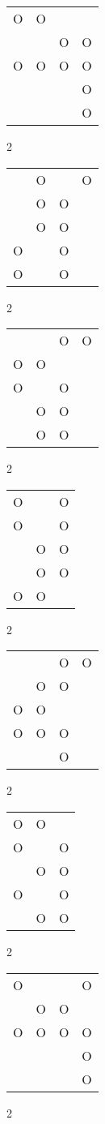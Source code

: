\begin{tabular}{|m{0.2cm}m{0.2cm}m{0.2cm}m{0.2cm}|}\hline
O&O& & \\
 & &O&O\\
O&O&O&O\\
 & & &O\\
 & & &O\\
\hline\end{tabular}2
\begin{tabular}{|m{0.2cm}m{0.2cm}m{0.2cm}m{0.2cm}|}\hline
 &O& &O\\
 &O&O& \\
 &O&O& \\
O& &O& \\
O& &O& \\
\hline\end{tabular}2
\begin{tabular}{|m{0.2cm}m{0.2cm}m{0.2cm}m{0.2cm}|}\hline
 & &O&O\\
O&O& & \\
O& &O& \\
 &O&O& \\
 &O&O& \\
\hline\end{tabular}2
\begin{tabular}{|m{0.2cm}m{0.2cm}m{0.2cm}|}\hline
O& &O\\
O& &O\\
 &O&O\\
 &O&O\\
O&O& \\
\hline\end{tabular}2
\begin{tabular}{|m{0.2cm}m{0.2cm}m{0.2cm}m{0.2cm}|}\hline
 & &O&O\\
 &O&O& \\
O&O& & \\
O&O&O& \\
 & &O& \\
\hline\end{tabular}2
\begin{tabular}{|m{0.2cm}m{0.2cm}m{0.2cm}|}\hline
O&O& \\
O& &O\\
 &O&O\\
O& &O\\
 &O&O\\
\hline\end{tabular}2
\begin{tabular}{|m{0.2cm}m{0.2cm}m{0.2cm}m{0.2cm}|}\hline
O& & &O\\
 &O&O& \\
O&O&O&O\\
 & & &O\\
 & & &O\\
\hline\end{tabular}2
